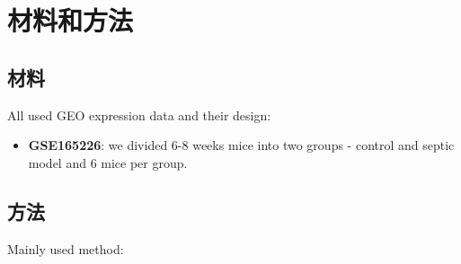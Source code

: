 \documentclass[
]{article}
\providecommand{\tightlist}{%
  \setlength{\itemsep}{0pt}\setlength{\parskip}{0pt}}
\begin{document}
\hypertarget{methods}{%
\section{材料和方法}\label{methods}}

\hypertarget{ux6750ux6599}{%
\subsection{材料}\label{ux6750ux6599}}

All used GEO expression data and their design:

\begin{itemize}
\tightlist
\item
  \textbf{GSE165226}: we divided 6-8 weeks mice into two groups - control and septic model and 6 mice per group.
\end{itemize}

\hypertarget{ux65b9ux6cd5}{%
\subsection{方法}\label{ux65b9ux6cd5}}

Mainly used method:
\end{document}
